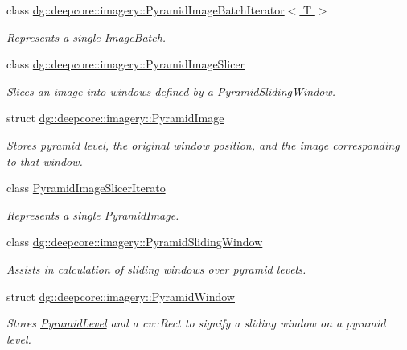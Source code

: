 \begin{DoxyCompactItemize}
class \hyperlink{classdg_1_1deepcore_1_1imagery_1_1_pyramid_image_batch_iterator}{dg\+::deepcore\+::imagery\+::\+Pyramid\+Image\+Batch\+Iterator$<$ T $>$}
\begin{DoxyCompactList}\small\item\em Represents a single \hyperlink{structdg_1_1deepcore_1_1imagery_1_1_image_batch}{Image\+Batch}. \end{DoxyCompactList}\item 
class \hyperlink{classdg_1_1deepcore_1_1imagery_1_1_pyramid_image_slicer}{dg\+::deepcore\+::imagery\+::\+Pyramid\+Image\+Slicer}
\begin{DoxyCompactList}\small\item\em Slices an image into windows defined by a \hyperlink{classdg_1_1deepcore_1_1imagery_1_1_pyramid_sliding_window}{Pyramid\+Sliding\+Window}. \end{DoxyCompactList}\item 
struct \hyperlink{structdg_1_1deepcore_1_1imagery_1_1_pyramid_image}{dg\+::deepcore\+::imagery\+::\+Pyramid\+Image}
\begin{DoxyCompactList}\small\item\em Stores pyramid level, the original window position, and the image corresponding to that window. \end{DoxyCompactList}\item 
class \hyperlink{class_pyramid_image_slicer_iterato}{Pyramid\+Image\+Slicer\+Iterato}
\begin{DoxyCompactList}\small\item\em Represents a single Pyramid\+Image. \end{DoxyCompactList}\item 
class \hyperlink{classdg_1_1deepcore_1_1imagery_1_1_pyramid_sliding_window}{dg\+::deepcore\+::imagery\+::\+Pyramid\+Sliding\+Window}
\begin{DoxyCompactList}\small\item\em Assists in calculation of sliding windows over pyramid levels. \end{DoxyCompactList}\item 
struct \hyperlink{structdg_1_1deepcore_1_1imagery_1_1_pyramid_window}{dg\+::deepcore\+::imagery\+::\+Pyramid\+Window}
\begin{DoxyCompactList}\small\item\em Stores \hyperlink{structdg_1_1deepcore_1_1imagery_1_1_pyramid_level}{Pyramid\+Level} and a cv\+::\+Rect to signify a sliding window on a pyramid level. \end{DoxyCompactList}\item 

\end{DoxyCompactItemize}
